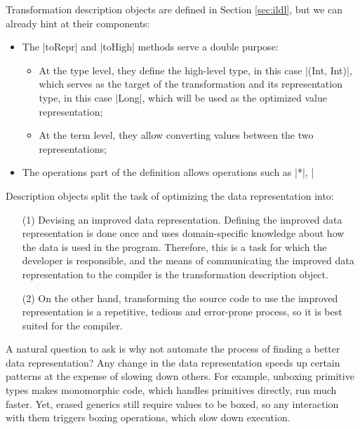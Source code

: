 \noindent
Transformation description objects are defined in Section \ref{sec:ildl}, but we can already hint at their components:
\begin{itemize}
  \item The |toRepr| and |toHigh| methods serve a double purpose:
  \begin{itemize}
    \item At the type level, they define the high-level type, in this case |(Int, Int)|, which serves as the target of the transformation and its representation type, in this case |Long|, which will be used as the optimized value representation;
    \item At the term level, they allow converting values between the two representations;
  \end{itemize}
  \item The operations part of the definition allows operations such as |*|, |%
\end{itemize}

Description objects split the task of optimizing the data representation into:
\begin{itemize}
\item[(1)] Devising an improved data representation. Defining the improved data representation is done once and uses domain-specific knowledge about how the data is used in the program. Therefore, this is a task for which the developer is responsible, and the means of communicating the improved data representation to the compiler is the transformation description object.
\item[(2)] On the other hand, transforming the source code to use the improved representation is a repetitive, tedious and error-prone process, so it is best suited for the compiler.
\end{itemize}

A natural question to ask is why not automate the process of finding a better data representation? Any change in the data representation speeds up certain patterns at the expense of slowing down others. For example, unboxing primitive types makes monomorphic code, which handles primitives directly, run much faster. Yet, erased generics still require values to be boxed, so any interaction with them triggers boxing operations, which slow down execution. %

